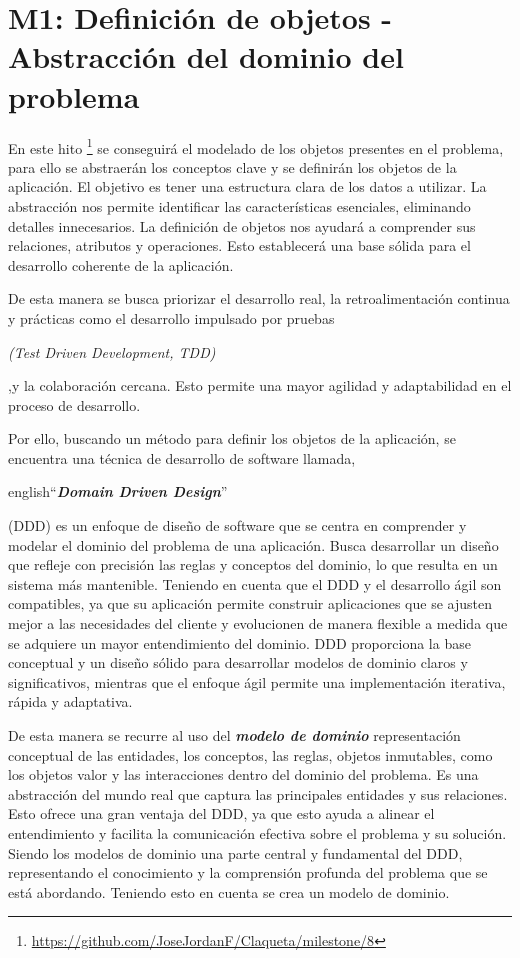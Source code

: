\section{M1: Definición de objetos - Abstracción del dominio del problema}

En este hito \footnote{\url{https://github.com/JoseJordanF/Claqueta/milestone/8}} se conseguirá el 
modelado de los objetos presentes en el problema, para ello se abstraerán 
los conceptos clave y se definirán los objetos de la aplicación. El objetivo es tener una estructura 
clara de los datos a utilizar. La abstracción nos permite identificar las características 
esenciales, eliminando detalles innecesarios. La definición de objetos nos ayudará a comprender sus 
relaciones, atributos y operaciones. Esto establecerá una base sólida para el desarrollo coherente 
de la aplicación.

De esta manera se busca priorizar el desarrollo real, la retroalimentación continua y prácticas como 
el desarrollo impulsado por pruebas \begin{otherlanguage}{english}\textit{(Test Driven Development, TDD)}\end{otherlanguage}  ,y la colaboración cercana. Esto permite una mayor 
agilidad y adaptabilidad en el proceso de desarrollo.

Por ello, buscando un método para definir los objetos de la aplicación, se encuentra una técnica de 
desarrollo de software llamada, \begin{otherlanguage}
{english}``\textit{\textbf{Domain Driven Design}}''\end{otherlanguage}(DDD) \cite{NvDDD} es un enfoque 
de diseño de software que se centra en comprender y modelar el dominio del problema de una aplicación. 
Busca desarrollar un diseño que refleje con precisión las reglas y conceptos del dominio, lo que 
resulta en un sistema más mantenible. Teniendo en cuenta que el DDD y el desarrollo ágil son 
compatibles, ya que su aplicación permite construir aplicaciones que se ajusten mejor a las necesidades 
del cliente y evolucionen de manera flexible a medida que se adquiere un mayor entendimiento del 
dominio. DDD proporciona la base conceptual y un diseño sólido para desarrollar modelos de dominio 
claros y significativos, mientras que el enfoque ágil permite una implementación iterativa, rápida y 
adaptativa.

De esta manera se recurre al uso del \textit{\textbf{modelo de dominio}} representación conceptual de 
las entidades, los conceptos, las reglas, objetos inmutables, como los objetos valor y las 
interacciones dentro del dominio del problema. Es una abstracción del mundo real que captura las 
principales entidades y sus relaciones. Esto ofrece una gran ventaja del DDD, ya que esto ayuda a 
alinear el entendimiento y facilita la comunicación efectiva sobre el problema y su solución. Siendo 
los modelos de dominio una parte central y fundamental del DDD, representando el conocimiento y la 
comprensión profunda del problema que se está abordando. Teniendo esto en cuenta se crea un modelo de 
dominio.

